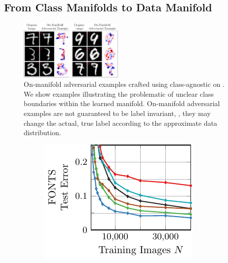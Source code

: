 \begin{appendix}
\section{From Class Manifolds to Data Manifold}
\label{sec:appendix-data-manifold}

\begin{figure}[t]
    \centering
    \vskip -0.4cm
    \includegraphics[width=0.45\textwidth]{appendix_data_examples.pdf}
    \caption{On-manifold adversarial examples crafted using class-agnostic \VAEGANs on \MNIST. We show examples illustrating the problematic of unclear class boundaries within the learned manifold. On-manifold adversarial examples are not guaranteed to be label invariant, \ie, they may change the actual, true label according to the approximate data distribution.}
    \label{fig:appendix-data-examples}
\end{figure}
\begin{figure}[t]
    \centering
    \vskip -0.4cm
    \begin{subfigure}{0.235\textwidth}
        \centering
        \includegraphics[width=\textwidth]{appendix_data_fonts_error.pdf}
    \end{subfigure}
    \begin{subfigure}{0.235\textwidth}

\end{subfigure}
\end{figure}
\end{appendix}
